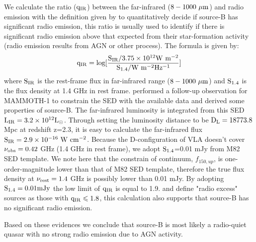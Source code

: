 \documentclass[../Results.tex]{subfiles}
\begin{document}
	 We calculate the ratio ($\rm q_{IR}$) between the far-infrared ($\rm 8-1000 \ \mu m$) and radio emission with the definition given by \cite{ivison2010far} to quantitatively decide if source-B has significant radio emission, this ratio is usually used to identify if there is significant radio emission above that expected from their star-formation activity (radio emission results from AGN or other process). The formula is given by:
	\begin{equation}
		\rm q_{IR}=log[\frac{S_{IR}/3.75 \times 10^{12} W \ m^{-2}}{S_{1.4}/W \ m^{-2} Hz^{-1}}]
		\label{q_IR}
	\end{equation}
	where $\rm S_{IR}$ is the rest-frame flux in far-infrared range ($8-1000 \ \rm \mu m $) and $\rm S_{1.4}$ is the flux density at 1.4 GHz in rest frame. \citet{arrigoni2018overdensity} performed a follow-up observation for MAMMOTH-1 to constrain the SED with the available data and derived some properties of source-B. The far-infrared luminosity is integrated from this SED $\rm L_{IR}=3.2 \times 10^{12}L_{\odot}$. Through setting the luminosity distance to be $\rm D_{L}=18773.8$ Mpc at redshift z=2.3, it is easy to calculate the far-infrared flux $\rm S_{IR}=2.9 \times 10^{-16}\ W \ cm^{-2}$.  Because the D-configuration of VLA doesn't cover $\rm \nu_{obs}=0.42$ GHz (1.4 GHz in rest frame), we adopt $\rm S_{1.4}$=0.01 mJy from M82 SED template. We note here that the constrain of continuum, $f_{150,up}$, is one-order-magnitude lower than that of M82 SED template, therefore the true flux density at $\rm \nu_{rest}=1.4$ GHz is possibly lower than 0.01 mJy. By adopting $\rm S_{1.4}=0.01 mJy$ the low limit of $\rm q_{IR}$ is equal to 1.9. \citet{ivison2010far} and \citet{del2013goods} define "radio excess" sources as those with $\rm q_{IR} \leqslant 1.8$, this calculation also supports that source-B has no significant radio emission.
	
	Based on these evidences we conclude that source-B is most likely a radio-quiet quasar with no strong radio emission due to AGN activity.
\end{document}
